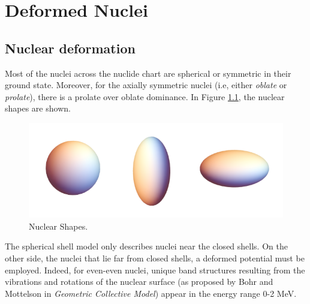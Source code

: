 \chapter{Deformed Nuclei}

\section{Nuclear deformation}

Most of the nuclei across the nuclide chart are spherical or symmetric in their ground state. Moreover, for the axially symmetric nuclei (i.e, either \emph{oblate} or \emph{prolate}), there is a prolate over oblate dominance. In Figure \ref{nuclear_shapes}, the nuclear shapes are shown.

\begin{figure}[ht]
    \centering
    \includegraphics[scale=0.3]{Chapters/Figures/nuclear_shapes.png}
    \caption{Nuclear Shapes.}
    \label{nuclear_shapes}
\end{figure}

The spherical shell model only describes nuclei near the closed shells. On the other side, the nuclei that lie far from closed shells, a deformed potential must be employed. Indeed, for even-even nuclei, unique band structures resulting from the vibrations and rotations of the nuclear surface (as proposed by Bohr and Mottelson \cite{bohr1998nuclear} in \emph{Geometric Collective Model}) appear in the energy range 0-2 MeV.